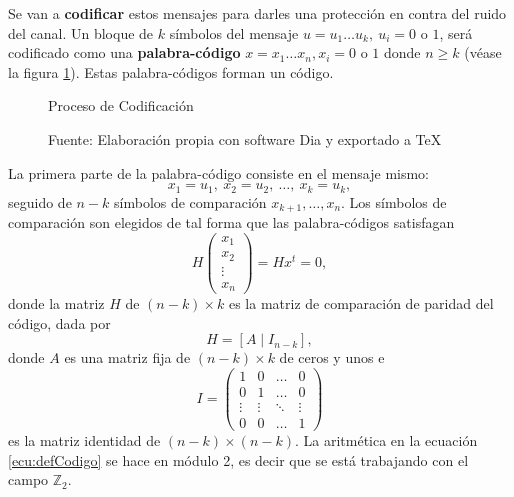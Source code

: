 Se van a \textbf{codificar} estos mensajes para darles una protección en contra del ruido del canal. Un bloque de $k$ símbolos del mensaje $u = u_1\dots u_k,\ u_i = 0 \mbox{ o } 1$, será codificado como una \textbf{palabra-código} $x = x_1 \dots x_n, x_i = 0 \mbox{ o } 1$ donde $n \geq k$ (véase la figura \ref{fig:codificacion}). Estas palabra-códigos forman un código.
\begin{figure}
\caption{Proceso de Codificación}
\centering

\caption*{Fuente: Elaboración propia con software Dia y exportado a \TeX}
\label{fig:codificacion}
\end{figure}
La primera parte de la palabra-código consiste en el mensaje mismo: \[ x_1 = u_1,\ x_2 = u_2,\ \dots ,\ x_k = u_k, \] seguido de $n-k$ símbolos de comparación $x_{k+1}, \dots , x_n$. 
Los símbolos de comparación son elegidos de tal forma que las palabra-códigos satisfagan 
\[ H \begin{pmatrix}
x_1 \\ 
x_2 \\
\vdots \\
x_n
\end{pmatrix} = Hx^{t} = 0, \] donde la matriz $H$ de $(n-k)\times k$ es la matriz de comparación de paridad del código, dada por 
\begin{equation}\label{ecu:defCodigo}
H = [A \mid I_{n-k}],
\end{equation}  
donde $A$ es una matriz fija de $(n-k)\times k$ de ceros y unos e \[ I = \begin{pmatrix}
1 & 0 & \dots & 0 \\
0 & 1 & \dots & 0 \\
\vdots & \vdots & \ddots & \vdots \\
0 & 0 & \dots & 1
\end{pmatrix} \] es la matriz identidad de $(n-k) \times (n-k)$. La aritmética en la ecuación \ref{ecu:defCodigo} se hace en módulo 2, es decir que se está trabajando con el campo $\mathds{Z}_2$. 
